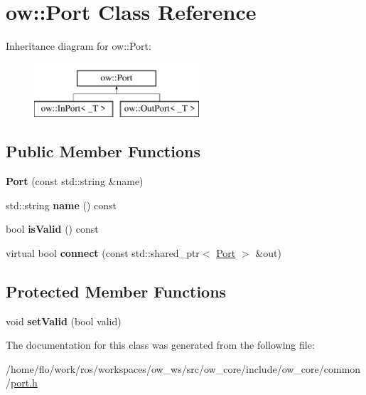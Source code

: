 \hypertarget{classow_1_1Port}{}\section{ow\+:\+:Port Class Reference}
\label{classow_1_1Port}
Inheritance diagram for ow\+:\+:Port\+:\begin{figure}[H]
\begin{center}
\leavevmode
\includegraphics[height=2.000000cm]{d4/dfb/classow_1_1Port}
\end{center}
\end{figure}
\subsection*{Public Member Functions}
\begin{DoxyCompactItemize}
\item 
{\bfseries Port} (const std\+::string \&name)\hypertarget{classow_1_1Port_aec2c508f05f558718d430a95c4451f89}{}\label{classow_1_1Port_aec2c508f05f558718d430a95c4451f89}

\item 
std\+::string {\bfseries name} () const \hypertarget{classow_1_1Port_aa205801586b62a59a948485af64ded00}{}\label{classow_1_1Port_aa205801586b62a59a948485af64ded00}

\item 
bool {\bfseries is\+Valid} () const \hypertarget{classow_1_1Port_a2e83d7381abe4bf7ff78c0b297af8f08}{}\label{classow_1_1Port_a2e83d7381abe4bf7ff78c0b297af8f08}

\item 
virtual bool {\bfseries connect} (const std\+::shared\+\_\+ptr$<$ \hyperlink{classow_1_1Port}{Port} $>$ \&out)\hypertarget{classow_1_1Port_a058e061931cdc906193b42f81ff92820}{}\label{classow_1_1Port_a058e061931cdc906193b42f81ff92820}

\end{DoxyCompactItemize}
\subsection*{Protected Member Functions}
\begin{DoxyCompactItemize}
\item 
void {\bfseries set\+Valid} (bool valid)\hypertarget{classow_1_1Port_a401622c4536ede8a320ea470ca1455c3}{}\label{classow_1_1Port_a401622c4536ede8a320ea470ca1455c3}

\end{DoxyCompactItemize}


The documentation for this class was generated from the following file\+:\begin{DoxyCompactItemize}
\item 
/home/flo/work/ros/workspaces/ow\+\_\+ws/src/ow\+\_\+core/include/ow\+\_\+core/common/\hyperlink{port_8h}{port.\+h}\end{DoxyCompactItemize}
